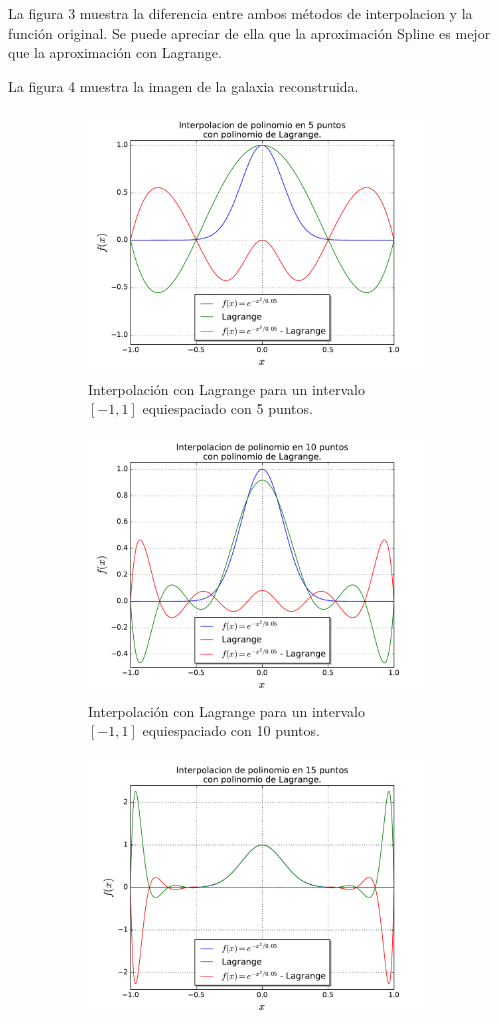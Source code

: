 \documentclass[a4paper, 11pt, spanish]{article}
\begin{document}
La figura 3 muestra la diferencia entre ambos m\'etodos de interpolacion y la funci\'on original. Se puede apreciar de ella que la aproximaci\'on Spline es mejor que la aproximaci\'on con Lagrange.

La figura 4 muestra la imagen de la galaxia reconstruida.
\begin{figure}[!hbpt]
\centering
\begin{subfigure}{.5\textwidth}
  \centering
  \includegraphics[width=9cm, height=7cm]{img/lagrange5.pdf}
  \caption{Interpolaci\'on con Lagrange para un intervalo\\ $[-1,1]$ equiespaciado con 5 puntos.}
\end{subfigure}%
\begin{subfigure}{.5\textwidth}
  \centering
  \includegraphics[width=9cm, height=7cm]{img/lagrange10.pdf}
  \caption{Interpolaci\'on con Lagrange para un intervalo\\ $[-1,1]$ equiespaciado con 10 puntos.}
\end{subfigure}
\begin{subfigure}{.5\textwidth}
  \centering
  \includegraphics[width=9cm, height=7cm]{img/lagrange15.pdf}

\end{subfigure}
\end{figure}
\end{document}
